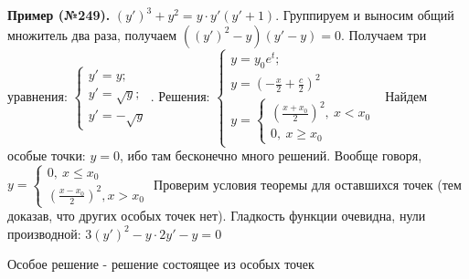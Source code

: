 \textbf{Пример (№249).} $(y')^3+y^2=y\cdot y'(y'+1)$. Группируем и выносим
общий множитель два раза, получаем $((y')^2-y)(y'-y)=0$. 
Получаем три уравнения: 
$\begin{cases}y'=y;\\y'=\sqrt{y};\\y'=-\sqrt{y}\end{cases}$. Решения:
$\begin{cases}y=y_0e^t;\\y=\left( -\frac{x}{2}+\frac{c}{2}\right)^2 \\
y=\begin{cases}\left( \frac{x+x_0}{2} \right)^2,~x<x_0\\0,~x\geqslant x_0
    
\end{cases}  
\end{cases}$
Найдем особые точки: $y=0$, ибо там бесконечно много решений.
Вообще говоря, 
 $y=\begin{cases}0,~x\leqslant x_0\\\left( \frac{x-x_0}{2} \right)^2,x>x_0
  
 \end{cases}$
Проверим условия теоремы для оставшихся точек (тем доказав, что других особых 
точек нет). Гладкость функции очевидна, нули производной:
$3(y')^2-y\cdot 2y'-y=0$

\begin{defin}
Особое решение - решение состоящее из особых точек
\end{defin}


